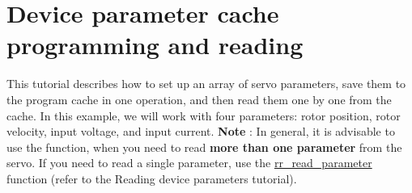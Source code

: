 \hypertarget{group__tutor__c__param__cache}{}\section{Device parameter cache programming and reading}
\label{group__tutor__c__param__cache}
This tutorial describes how to set up an array of servo parameters, save them to the program cache in one operation, and then read them one by one from the cache. In this example, we will work with four parameters\+: rotor position, rotor velocity, input voltage, and input current. {\bfseries  Note }\+: In general, it is advisable to use the function, when you need to read {\bfseries more than one parameter} from the servo. If you need to read a single parameter, use the \hyperlink{group___realtime_gae665cf9423955f882e94282d66ba6a60}{rr\+\_\+read\+\_\+parameter} function (refer to the Reading device parameters tutorial).


